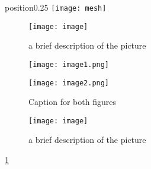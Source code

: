 \begin{wrapfigure}{position}{0.25\textwidth} 
    \centering
    \texttt{[image: mesh]}
\end{wrapfigure}


\begin{figure}[t]
    \texttt{[image: image]}
    \centering
    \caption{a brief description of the picture}
\end{figure}


\begin{figure}[h]
  \centering
  \begin{minipage}{0.45\textwidth}
    \centering
    \texttt{[image: image1.png]}
  \end{minipage}
  \begin{minipage}{0.45\textwidth}
    \centering
    \texttt{[image: image2.png]}
  \end{minipage}
  \caption{Caption for both figures}
\end{figure}


\begin{figure}[t]
    \texttt{[image: image]}
    \centering
    \caption{a brief description of the picture}
    \label{fig:label1}  %
\end{figure}
\ref{fig:label1}        %
\pageref{fig:label1}    %


\listoffigures
